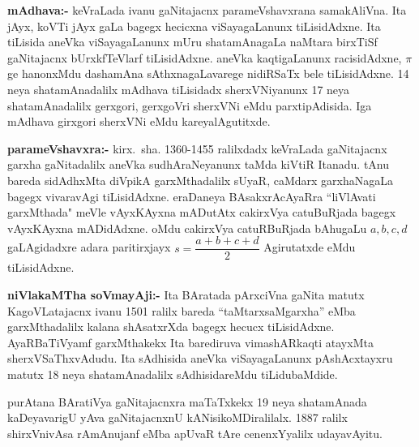 \textbf{mAdhava:-} keVraLada ivanu gaNitajacnx parameVshavxrana samakAliVna. Ita jAyx, koVTi jAyx gaLa bagegx hecicxna viSayagaLanunx tiLisidAdxne. Ita tiLisida aneVka viSayagaLanunx mUru shatamAnagaLa naMtara birxTiSf gaNitajacnx bUrxkfTeVlarf tiLisidAdxne. aneVka kaqtigaLanunx racisidAdxne, $\pi$ ge hanonxMdu dashamAna sAthxnagaLavarege nidiRSaTx bele tiLisidAdxne. {\rm 14} neya shatamAnadalilx mAdhava tiLisidadx sherxVNiyanunx {\rm 17} neya shatamAnadalilx gerxgori, gerxgoVri sherxVNi eMdu parxtipAdisida. Iga mAdhava girxgori sherxVNi eMdu kareyalAgutitxde.

\textbf{parameVshavxra:-} kirx.~sha. {\rm 1360-1455} ralilxdadx keVraLada gaNitajacnx garxha gaNitadalilx aneVka sudhAraNeyanunx taMda kiVtiR Itanadu. tAnu bareda sidAdhxMta diVpikA garxMthadalilx sUyaR, caMdarx garxhaNagaLa bagegx vivaravAgi tiLisidAdxne. eraDaneya BAsakxrAcAyaRra ``liVlAvati garxMthada" meVle vAyxKAyxna mADutAtx cakirxVya catuBuRjada bagegx vAyxKAyxna mADidAdxne. oMdu cakirxVya catuRBuRjada bAhugaLu $a, b, c, d$ gaLAgidadxre adara paritirxjayx $s=\dfrac{a+b+c+d}{2}$ Agirutatxde eMdu tiLisidAdxne. 

\textbf{niVlakaMTha soVmayAji:-} Ita BAratada pArxciVna gaNita matutx KagoVLatajacnx ivanu {\rm 1501} ralilx bareda ``taMtarxsaMgarxha'' eMba garxMthadalilx kalana shAsatxrXda bagegx hecucx tiLisidAdxne. AyaRBaTiVyamf garxMthakekx Ita barediruva vimashARkaqti atayxMta sherxVSaThxvAdudu. Ita sAdhisida aneVka viSayagaLanunx pAshAcxtayxru matutx {\rm 18} neya shatamAnadalilx sAdhisidareMdu tiLidubaMdide.

purAtana BAratiVya gaNitajacnxra maTaTxkekx {\rm 19} neya shatamAnada kaDeyavarigU yAva gaNitajacnxnU kANisikoMDiralilalx. {\rm 1887} ralilx shirxVnivAsa rAmAnujanf eMba apUvaR tAre cenenxYyalilx udayavAyitu. 


